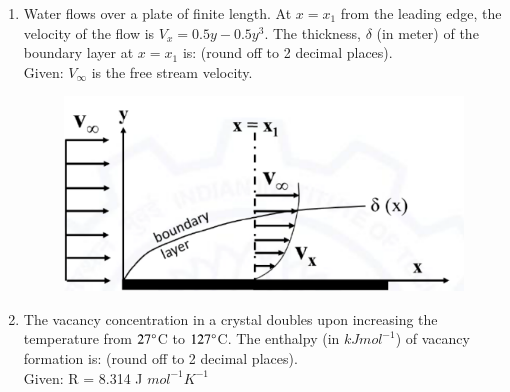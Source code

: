 \documentclass[journal]{IEEEtran}
\theoremstyle{remark}
\begin{document}
\begin{enumerate}
\item Water flows over a plate of finite length. At $x = x_1$ from the leading edge, the velocity of the flow is $V_x = 0.5y - 0.5y^3$. The thickness, $\delta$ (in meter) of the boundary layer at $x = x_1$ is: \underline {\hspace{2cm}} (round off to 2 decimal places). \\ Given: $V_\infty$ is the free stream velocity.\hfill{}
\begin{figure}[H]
    \centering
    \includegraphics[width=0.4\columnwidth]{figs/Q.24.png}
    \caption{}
    \label{fig:placeholder}
\end{figure}


\item The vacancy concentration in a crystal doubles upon increasing the temperature from $27\degree$C to $127\degree$C. The enthalpy (in $kJ mol^{-1}$) of vacancy formation is: \underline {\hspace{2cm}} (round off to 2 decimal places). \\ Given: R = 8.314 J $mol^{-1} K^{-1}$ \hfill{}
\end{enumerate}
\end{document}
